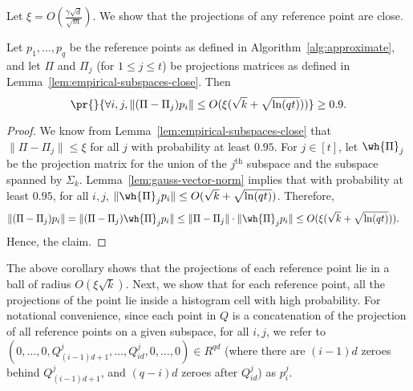 Let $\xi = O\left(\tfrac{\gamma\sqrt{d}}{\sqrt{m}}\right)$. We
show that the projections of any
reference point are close.

\begin{corollary}\label{coro:reference-projections-close}
    Let $p_1,\dots,p_q$ be the reference points as
    defined in Algorithm~\ref{alg:approximate}, and
    let $\Pi$ and $\Pi_j$ (for $1 \leq j \leq t$) be
    projections matrices as defined in Lemma~\ref{lem:empirical-subspaces-close}.
    Then
    $$\pr{}{\forall i,j, \|(\Pi-\Pi_j)p_i\| \leq O(\xi(\sqrt{k}+\sqrt{\ln(qt)}))} \geq 0.9.$$
\end{corollary}
\begin{proof}
    We know from Lemma~\ref{lem:empirical-subspaces-close}
    that $\|\Pi-\Pi_j\| \leq \xi$ for all $j$ with
    probability at least $0.95$. For $j \in [t]$, let
    $\wh{\Pi}_j$ be the projection matrix for the union
    of the $j^{\text{th}}$ subspace and the subspace
    spanned by $\Sigma_k$. Lemma~\ref{lem:gauss-vector-norm}
    implies that with probability at least $0.95$,
    for all $i,j$, $\|\wh{\Pi}_j p_i\| \leq O(\sqrt{k}+\sqrt{\ln(qt)})$.
    Therefore,
    \begin{align*}
        \|(\Pi-\Pi_j)p_i\| &= \|(\Pi-\Pi_j)\wh{\Pi}_jp_i\|
            \leq \|\Pi-\Pi_j\|\cdot\|\wh{\Pi}_jp_i\|
            \leq O(\xi(\sqrt{k}+\sqrt{\ln(qt)})).
    \end{align*}
    Hence, the claim.
\end{proof}

The above corollary shows that the projections of
each reference point lie in a ball of radius $O(\xi\sqrt{k})$.
Next, we show that for each reference point, all the
projections of the point lie inside a histogram cell
with high probability. For notational convenience, since
each point in $Q$ is a concatenation of the projection
of all reference points on a given subspace, for all
$i,j$, we refer to
$(0,\dots,0,Q_{(i-1)d+1}^j,\dots,Q_{id}^j,0,\dots,0) \in R^{qd}$
(where there are $(i-1)d$ zeroes behind $Q_{(i-1)d+1}^j$,
and $(q-i)d$ zeroes after $Q_{id}^j$) as $p_i^j$.

